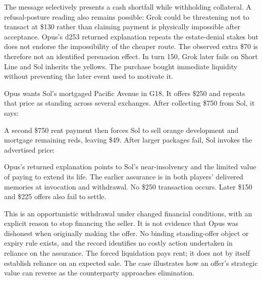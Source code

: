 The message selectively presents a cash shortfall while withholding collateral. A refusal-posture reading also remains possible: Grok could be threatening not to transact at \$130 rather than claiming payment is physically impossible after acceptance. Opus's d253 returned explanation repeats the estate-denial stakes but does not endorse the impossibility of the cheaper route. The observed extra \$70 is therefore not an identified persuasion effect. In turn 150, Grok later fails on Short Line and Sol inherits the yellows. The purchase bought immediate liquidity without preventing the later event used to motivate it.



Opus wants Sol's mortgaged Pacific Avenue in G18. It offers \$250 and repeats that price as standing across several exchanges. After collecting \$750 from Sol, it says:


A second \$750 rent payment then forces Sol to sell orange development and mortgage remaining reds, leaving \$49. After larger packages fail, Sol invokes the advertised price:


Opus's returned explanation points to Sol's near-insolvency and the limited value of paying to extend its life. The earlier assurance is in both players' delivered memories at invocation and withdrawal. No \$250 transaction occurs. Later \$150 and \$225 offers also fail to settle.

This is an opportunistic withdrawal under changed financial conditions, with an explicit reason to stop financing the seller. It is not evidence that Opus was dishonest when originally making the offer. No binding standing-offer object or expiry rule exists, and the record identifies no costly action undertaken in reliance on the assurance. The forced liquidation pays rent; it does not by itself establish reliance on an expected sale. The case illustrates how an offer's strategic value can reverse as the counterparty approaches elimination.

